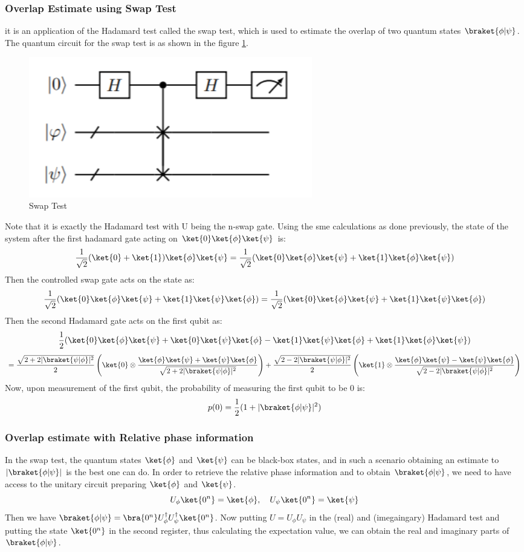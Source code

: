 \documentclass[12pt, oneside]{book}
\theoremstyle{definition}
\theoremstyle{definition}
\theoremstyle{remark}
\begin{document}
\subsubsection{Overlap Estimate using Swap Test}
it is an application of the Hadamard test called the swap test, which is used to estimate the overlap of two quantum states
$\braket{\phi|\psi}$. The quantum circuit for the swap test is as shown in the figure \ref{fig:swaptest}.
\begin{figure}[H]
    \centering
    \includegraphics[width=0.6\textwidth]{../images/swaptest.png}
    \caption{Swap Test}
    \label{fig:swaptest}
\end{figure}
Note that it is exactly the Hadamard test with U being the n-swap gate.
Using the sme calculations as done previously, the state of the system after the first hadamard gate acting on
$\ket{0}\ket{\phi}\ket{\psi}$ is:
\[
\frac{1}{\sqrt{2}}(\ket{0}+\ket{1})\ket{\phi}\ket{\psi}=\frac{1}{\sqrt{2}}(\ket{0}\ket{\phi}\ket{\psi}+\ket{1}\ket{\phi}\ket{\psi})
\]
Then the controlled swap gate acts on the state as:
\[
\frac{1}{\sqrt{2}}(\ket{0}\ket{\phi}\ket{\psi}+\ket{1}\ket{\psi}\ket{\phi})=\frac{1}{\sqrt{2}}(\ket{0}\ket{\phi}\ket{\psi}+\ket{1}\ket{\psi}\ket{\phi})
\]
Then the second Hadamard gate acts on the first qubit as:
\[
\frac{1}{2}(\ket{0}\ket{\phi}\ket{\psi}+\ket{0}\ket{\psi}\ket{\phi}-\ket{1}\ket{\psi}\ket{\phi}+\ket{1}\ket{\phi}\ket{\psi})
\]
\[
=\frac{\sqrt{2+2|\braket{\psi|\phi}|^2}}{2}\left(\ket{0}\otimes\frac{\ket{\phi}\ket{\psi}+\ket{\psi}\ket{\phi}}{\sqrt{2+2|\braket{\psi|\phi}|^2}}\right) +\frac{\sqrt{2-2|\braket{\psi|\phi}|^2}}{2}\left(\ket{1}\otimes\frac{\ket{\phi}\ket{\psi}-\ket{\psi}\ket{\phi}}{\sqrt{2-2|\braket{\psi|\phi}|^2}}\right)
\]
Now, upon measurement of the first qubit, the probability of measuring the first qubit to be 0 is:
\[
p(0)=\frac{1}{2}(1+|\braket{\phi|\psi}|^2)
\]


\subsubsection{Overlap estimate with Relative phase information}
In the swap test, the quantum states $\ket{\phi}$ and $\ket{\psi}$ can be black-box states, and in 
such a scenario obtaining an estimate to $|\braket{\phi|\psi}|$ is the best one can do.
In order to retrieve the relative phase information and to obtain $\braket{\phi|\psi}$, we need to have access to the 
unitary circuit preparing $\ket{\phi}$ and $\ket{\psi}$.
\[
U_{\phi}\ket{0^n}=\ket{\phi}, \quad U_{\psi}\ket{0^n}=\ket{\psi}
\]
Then we have $\braket{\phi|\psi}=\bra{0^n}U_{\phi}^{\dagger}U_{\psi}^{\dagger}\ket{0^n}$.
Now putting $U=U_{\phi}U_{\psi}$ in the (real) and (imegaingary) Hadamard test and putting the state 
$\ket{0^n}$ in the second register, thus calculating the expectation value,
we can obtain the real and imaginary parts of $\braket{\phi|\psi}$.
\end{document}
